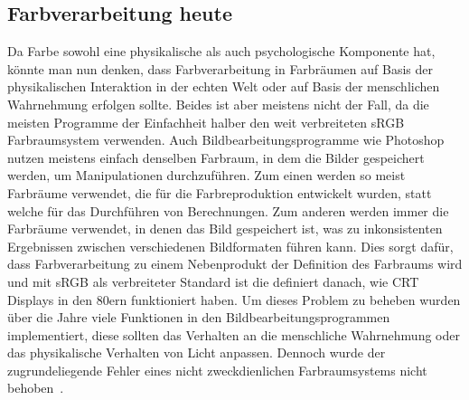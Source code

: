 \documentclass[12pt, a4paper, ngerman]{article}
\begin{document}
\subsection{Farbverarbeitung heute}
Da Farbe sowohl eine physikalische als auch psychologische Komponente hat, könnte man nun denken, 
dass Farbverarbeitung in Farbräumen auf Basis der physikalischen Interaktion in der echten Welt oder 
auf Basis der menschlichen Wahrnehmung erfolgen sollte.
Beides ist aber meistens nicht der Fall, da die meisten Programme der Einfachheit halber den weit verbreiteten sRGB Farbraumsystem verwenden.
Auch Bildbearbeitungsprogramme wie Photoshop nutzen meistens einfach denselben Farbraum, 
in dem die Bilder gespeichert werden, um Manipulationen durchzuführen. 
Zum einen werden so meist Farbräume verwendet, die für die Farbreproduktion entwickelt wurden, 
statt welche für das Durchführen von Berechnungen.
Zum anderen werden immer die Farbräume verwendet, in denen das Bild gespeichert ist, 
was zu inkonsistenten Ergebnissen zwischen verschiedenen Bildformaten führen kann.
Dies sorgt dafür, dass Farbverarbeitung zu einem Nebenprodukt der Definition des Farbraums wird und 
mit sRGB als verbreiteter Standard ist die definiert danach, wie \acs{CRT} Displays in den 80ern funktioniert haben.
Um dieses Problem zu beheben wurden über die Jahre viele Funktionen in den Bildbearbeitungsprogrammen implementiert, 
diese sollten das Verhalten an die menschliche Wahrnehmung oder das physikalische Verhalten von Licht anpassen. 
Dennoch wurde der zugrundeliegende Fehler eines nicht zweckdienlichen Farbraumsystems nicht behoben~\cite{Ottosson_2020}.
\end{document}
